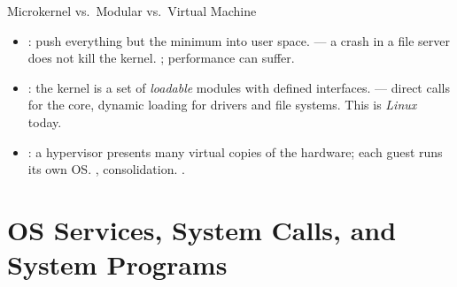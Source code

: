 \documentclass[aspectratio=169]{beamer}
\begin{document}
\begin{frame}{Microkernel vs.\ Modular vs.\ Virtual Machine}
  \begin{itemize}
    \item {}: push everything but the minimum into user space.
       --- a crash in a file server does
      not kill the kernel. ; performance can suffer.
    \item {}: the kernel is a set of \emph{loadable} modules with
      defined interfaces.  --- direct calls for the core,
      dynamic loading for drivers and file systems. This is \emph{Linux} today.
    \item {}: a hypervisor presents many virtual copies of
      the hardware; each guest runs its own OS. ,
      consolidation. .
  \end{itemize}
  \vspace{0.2cm}
\end{frame}


\section{OS Services, System Calls, and System Programs}
\end{document}
